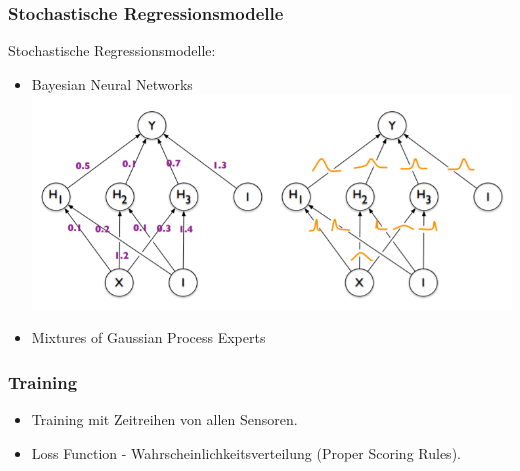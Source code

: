\documentclass[18pt]{beamer}
\begin{document}
\begin{frame}
  \frametitle{Stochastische Regressionsmodelle}
  Stochastische Regressionsmodelle:
  \begin{itemize}
  \item Bayesian Neural Networks
    \includegraphics[scale=0.35]{images/bnn}
  \item Mixtures of Gaussian Process Experts
  \end{itemize}
\end{frame}

\begin{frame}[]
  \frametitle{Training}
  \begin{itemize}
    \item Training mit Zeitreihen von allen Sensoren.
  \item Loss Function - Wahrscheinlichkeitsverteilung (Proper Scoring Rules).
  \end{itemize}
  
\end{frame}
\end{document}
